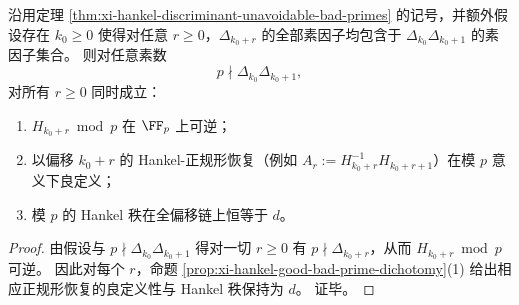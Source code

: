 \begin{corollary}[有限坏素数支撑下的全偏移良约化]\label{cor:xi-hankel-uniform-good-reduction-all-shifts}
沿用定理 \ref{thm:xi-hankel-discriminant-unavoidable-bad-primes} 的记号，并额外假设存在 \(k_0\ge 0\) 使得对任意 \(r\ge 0\)，\(\Delta_{k_0+r}\) 的全部素因子均包含于 \(\Delta_{k_0}\Delta_{k_0+1}\) 的素因子集合。
则对任意素数
\[
p\nmid \Delta_{k_0}\Delta_{k_0+1},
\]
对所有 \(r\ge 0\) 同时成立：
\begin{enumerate}
  \item \(H_{k_0+r}\bmod p\) 在 \(\FF_p\) 上可逆；
  \item 以偏移 \(k_0+r\) 的 Hankel-正规形恢复（例如 \(A_r:=H_{k_0+r}^{-1}H_{k_0+r+1}\)）在模 \(p\) 意义下良定义；
  \item 模 \(p\) 的 Hankel 秩在全偏移链上恒等于 \(d\)。
\end{enumerate}
\end{corollary}
\begin{proof}
由假设与 \(p\nmid \Delta_{k_0}\Delta_{k_0+1}\) 得对一切 \(r\ge 0\) 有 \(p\nmid \Delta_{k_0+r}\)，从而 \(H_{k_0+r}\bmod p\) 可逆。
因此对每个 \(r\)，命题 \ref{prop:xi-hankel-good-bad-prime-dichotomy}(1) 给出相应正规形恢复的良定义性与 Hankel 秩保持为 \(d\)。
证毕。
\end{proof}

\endinput
